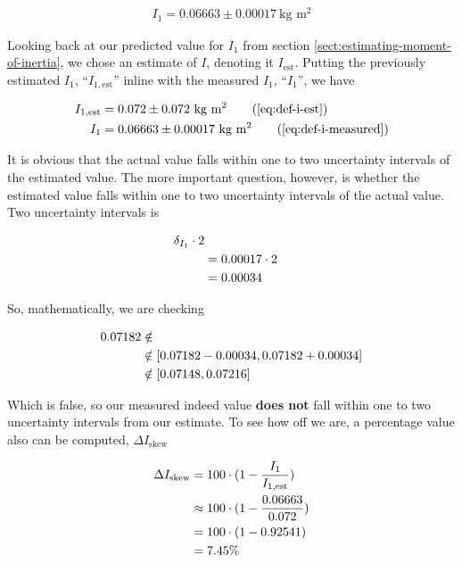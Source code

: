 \documentclass[coverpage]{article}
\newcommand{\iUnit}{\text{kg $\text{m}^2$}}
\begin{document}
	\begin{align}
		I_1 = 0.06663 \pm 0.00017\ \iUnit \label{eq:def-i-measured}
	\end{align}

	Looking back at our predicted value for $I_1$ from section \ref{sect:estimating-moment-of-inertia}, we chose an estimate of $I$, denoting it $I_{\text{est}}$. Putting the previously estimated $I_1$, ``$I_{1, \text{est}}$'' inline with the measured $I_1$, ``$I_1$'', we have
		
	\begin{align}
		I_{1, \text{est}} &= 0.072 \pm 0.072\ \iUnit \tag{\ref{eq:def-i-est}} \\
		I_1 &= 0.06663 \pm 0.00017\ \iUnit \tag{\ref{eq:def-i-measured}}
	\end{align}

	It is obvious that the actual value falls within one to two uncertainty intervals of the estimated value. The more important question, however, is whether the estimated value falls within one to two uncertainty intervals of the actual value. Two uncertainty intervals is
	
	\begin{align}
		\delta_{I_1} \cdot 2 \notag \\
		&= 0.00017 \cdot 2 \notag \\
		&= 0.00034 \notag
	\end{align}
	
	So, mathematically, we are checking
	
	\begin{align}
		0.07182 &\notin \notag \\
		&\notin [0.07182 - 0.00034, 0.07182 + 0.00034] \notag \\
		&\notin [0.07148, 0.07216]
	\end{align}

	\newcommand{\iSkew}{\Delta{I}_{\text{skew}}}

	Which is false, so our measured indeed value \textbf{does not} fall within one to two uncertainty intervals from our estimate. To see how off we are, a percentage value also can be computed, $\iSkew$
	
	\begin{align}
		\iSkew &= 100 \cdot (1 - \frac{I_1}{I_{1, \text{est}}}) \notag \\
		&\approx 100 \cdot (1 - \frac{0.06663}{0.072}) \notag \\
		&= 100 \cdot (1 - 0.92541) \notag \\
		&= 7.45\%
	\end{align}
\end{document}
